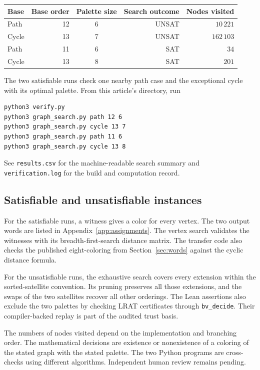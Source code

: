 \documentclass[11pt]{article}
\begin{document}
\begin{center}
\begin{tabular}{@{}lrcrr@{}}
\toprule
Base & Base order & Palette size & Search outcome & Nodes visited\\
\midrule
Path  & 12 & 6 & UNSAT & \(10\,221\)\\
Cycle & 13 & 7 & UNSAT & \(162\,103\)\\
Path  & 11 & 6 & SAT   & \(34\)\\
Cycle & 13 & 8 & SAT   & \(201\)\\
\bottomrule
\end{tabular}
\end{center}
The two satisfiable runs check one nearby path case and the exceptional
cycle with its optimal palette. From this article's directory, run
\begin{Verbatim}[fontsize=\small]
python3 verify.py
python3 graph_search.py path 12 6
python3 graph_search.py cycle 13 7
python3 graph_search.py path 11 6
python3 graph_search.py cycle 13 8
\end{Verbatim}
See \texttt{results.csv} for the machine-readable search summary and
\texttt{verification.log} for the build and computation record.

\subsection{Satisfiable and unsatisfiable instances}
For the satisfiable runs, a witness gives a color for every vertex.
The two output words are listed in Appendix~\ref{app:assignments}. The vertex search
validates the witnesses with its breadth-first-search distance matrix.
The transfer code also checks the published eight-coloring from
Section~\ref{sec:words} against the cyclic distance formula.

For the unsatisfiable runs, the exhaustive search covers every
extension within the sorted-satellite convention. Its pruning
preserves all those extensions, and the swaps of the two satellites
recover all other orderings. The Lean assertions also exclude the
two palettes by checking LRAT certificates through
\texttt{bv\_decide}. Their compiler-backed replay is part of the
audited trust basis.

The numbers of nodes visited depend on the implementation and
branching order. The mathematical decisions are existence or
nonexistence of a coloring of the stated graph with the stated
palette. The two Python programs are cross-checks using different
algorithms. Independent human review remains pending.
\end{document}
